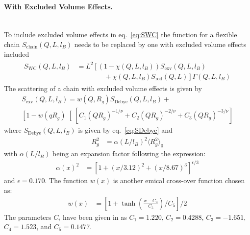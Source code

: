 \clearpage
\paragraph*{With Excluded Volume Effects.}~\\

To include excluded volume effects in eq.\ \ref{eq:SWC} the function for a flexible chain $S_\text{chain}(Q,L,l_B)$ needs to be replaced by one with excluded volume effects included
\begin{align}
\label{eq:exvSWC}
\begin{split}
S_\text{WC}(Q,L,l_B) &= L^2 \left[  \left(1-\chi(Q,L,l_B)\right)
            S_\text{exv}(Q,L,l_B) \right. \\
&  \left. \qquad  \qquad  +\chi(Q,L,l_B) S_\text{rod}(Q,L)    \right] \Gamma(Q,L,l_B)
\end{split}
\end{align}
The scattering of a chain with excluded volume effects is given by
\begin{multline}
S_\text{exv}(Q,L,l_B) = w(Q,R_g) S_\text{Debye}(Q,L,l_B) + \\
 \left[1-w(q R_g)\right[\left[C_1\left(QR_g\right)^{-1/\nu}
                                           + C_2\left(QR_g\right)^{-2/\nu}
                                           + C_3\left(QR_g\right)^{-3/\nu}\right]
\end{multline}
where $S_\text{Debye}(Q,L,l_B)$ is given by eq.\ \ref{eq:SDebye} and
\begin{align}
R_g^2&=\alpha(L/l_B)^2 \langle R_g^2\rangle_0
\label{eq:RgexvWC}
\end{align}
with $\alpha(L/l_B)$ being an expansion factor following the expression:
\begin{align}
\alpha(x)^2 &= \left[ 1+(x/3.12)^2+(x/8.67)^3 \right]^{\epsilon/3}
\end{align}
and $\epsilon=0.170$. The function $w(x)$ is another emical cross-over function chosen as:
\begin{align}
w(x) &= \left[ 1+\tanh\left(\frac{x-C_4}{C_5}\right)/C_5 \right]/2
\end{align}
The parameters $C_i$ have been given in \cite{Pedersen96Macrom} as
$C_1=1.220$, $C_2=0.4288$, $C_3=-1.651$, $C_4=1.523$, and $C_5=0.1477$.

